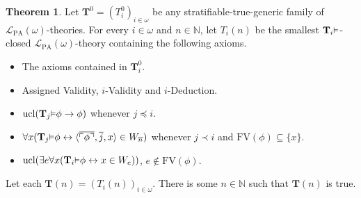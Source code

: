 \documentclass[reqno]{article}
\theoremstyle{definition}
\newtheorem{theorem}{Theorem}
\def\N{\mathbb{N}}
\def\L{\mathscr{L}}
\def\T{\mathbf{T}}
\def\FV{\mathrm{FV}}
\def\LPA{\L_{\mathrm{PA}}}
\renewcommand{\Pr}[1]{\T_{#1}\mbox{\small${\vDash}$}}
\newcommand{\ucl}[1]{\mathrm{ucl}(#1)}
\begin{document}
\begin{theorem}
\label{generalizedthreeonetwo}
Let $\T^0=(T^0_i)_{i\in\omega}$ be any stratifiable-true-generic family of $\LPA(\omega)$-theories.
For every $i\in\omega$ and $n\in\N$, let $T_i(n)$ be the smallest $\Pr i$-closed $\LPA(\omega)$-theory containing the following axioms.
\begin{itemize}
\item The axioms contained in $\T^0_i$.
\item Assigned Validity, $i$-Validity and $i$-Deduction.
\item $\ucl{\Pr j\phi\rightarrow\phi}$ whenever $j\preceq i$.
\item $\forall x(\Pr j\phi\leftrightarrow\langle\overline{\ulcorner\phi\urcorner},\overline j,x\rangle\in W_{\overline n})$
whenever $j\prec i$ and $\FV(\phi)\subseteq\{x\}$.
\item $\ucl{\exists e\forall x(\Pr i\phi\leftrightarrow x\in W_e)}$, $e\not\in\FV(\phi)$.
\end{itemize}
Let each $\T(n)=(T_i(n))_{i\in\omega}$.
There is some $n\in\N$ such that $\T(n)$ is true.
\end{theorem}
\end{document}
